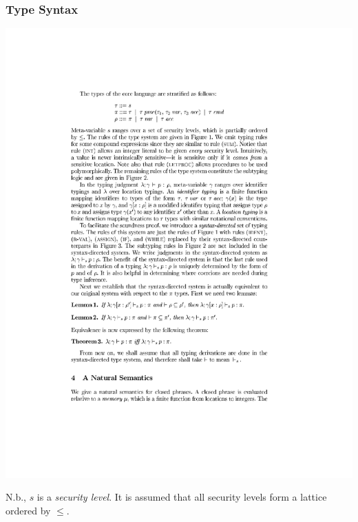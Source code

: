 \documentclass{beamer}
\begin{document}
\begin{frame}[fragile]
\frametitle{Type Syntax}

\begin{center}
\includegraphics[scale=1.5]{figures/typesyntax}
\end{center}

N.b., $s$ is a \emph{security level}. It is assumed that all security levels form a lattice ordered by $\leq$.

\end{frame}
\end{document}
